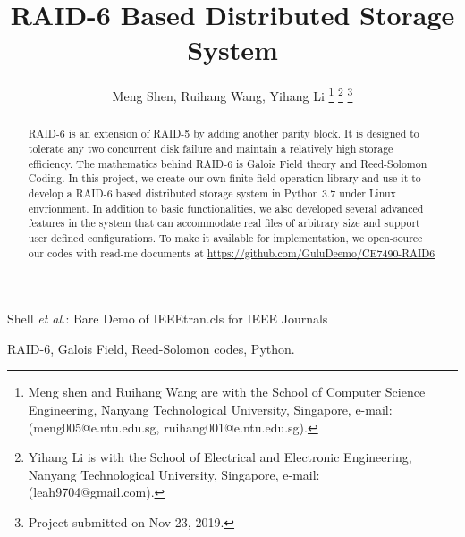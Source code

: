 \documentclass[journal]{IEEEtran}
\begin{document}
\title{RAID-6 Based Distributed Storage System}

\author{Meng Shen,
        Ruihang Wang,
        Yihang Li %
\thanks{Meng shen and Ruihang Wang are with the School
of Computer Science Engineering, Nanyang Technological University, Singapore,
e-mail: (meng005@e.ntu.edu.sg, ruihang001@e.ntu.edu.sg).}%
\thanks{Yihang Li is with the School
of Electrical and Electronic Engineering, Nanyang Technological University, Singapore,
e-mail: (leah9704@gmail.com).}%
\thanks{Project submitted on Nov 23, 2019.}}

%
{Shell \MakeLowercase{\textit{et al.}}: Bare Demo of IEEEtran.cls for IEEE Journals}

\maketitle

\begin{abstract}
RAID-6 is an extension of RAID-5 by adding another parity block. It is designed to tolerate any two concurrent disk failure and maintain a relatively high storage efficiency. The mathematics behind RAID-6 is Galois Field theory and Reed-Solomon Coding. In this project, we create our own finite field operation library and use it to develop a RAID-6 based distributed storage system in Python 3.7 under Linux envrionment. In addition to basic functionalities, we also developed several advanced features in the system that can accommodate real files of arbitrary size and support user defined configurations. To make it available for implementation, we open-source our codes with read-me documents at \url{https://github.com/GuluDeemo/CE7490-RAID6}
\end{abstract}

\begin{IEEEkeywords}
RAID-6, Galois Field, Reed-Solomon codes, Python. 
\end{IEEEkeywords}
\end{document}

